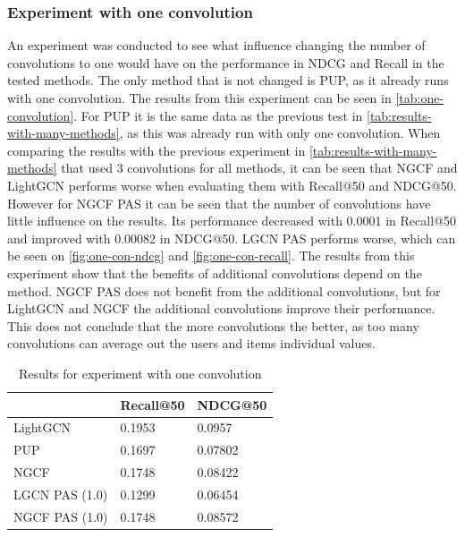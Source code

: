 \subsubsection{Experiment with one convolution}\label{sec:experiment-one-convolution}
An experiment was conducted to see what influence changing the number of convolutions to one would have on the performance in NDCG and Recall in the tested methods.
The only method that is not changed is PUP, as it already runs with one convolution.
The results from this experiment can be seen in \autoref{tab:one-convolution}.
For PUP it is the same data as the previous test in \autoref{tab:results-with-many-methods}, as this was already run with only one convolution.
When comparing the results with the previous experiment in \autoref{tab:results-with-many-methods} that used 3 convolutions for all methods, it can be seen that NGCF and LightGCN performs worse when evaluating them with Recall@50 and NDCG@50.
However for NGCF PAS it can be seen that the number of convolutions have little influence on the results.
Its performance decreased with 0.0001 in Recall@50 and improved with 0.00082 in NDCG@50.
LGCN PAS performs worse, which can be seen on \autoref{fig:one-con-ndcg} and \autoref{fig:one-con-recall}.
The results from this experiment show that the benefits of additional convolutions depend on the method.
NGCF PAS does not benefit from the additional convolutions, but for LightGCN and NGCF the additional convolutions improve their performance.
This does not conclude that the more convolutions the better, as too many convolutions can average out the users and items individual values.
\begin{table}[]
    \centering
    \begin{tabular}{|l|l|l|}
        \hline
        \rowcolor[HTML]{FFFFFF}
                       & Recall@50 & NDCG@50 \\ \hline
        LightGCN       & 0.1953    & 0.0957  \\ \hline
        PUP            & 0.1697    & 0.07802 \\ \hline
        NGCF           & 0.1748    & 0.08422 \\ \hline
        LGCN PAS (1.0) & 0.1299    & 0.06454 \\ \hline
        NGCF PAS (1.0) & 0.1748    & 0.08572 \\ \hline
    \end{tabular}
    \caption{Results for experiment with one convolution}
    \label{tab:one-convolution}
\end{table}

